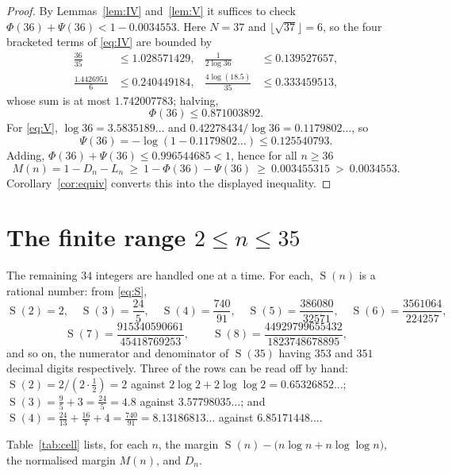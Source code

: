 \documentclass[11pt]{amsart}
\DeclareMathOperator{\Sfun}{S}
\begin{document}
\begin{proof}
By Lemmas~\ref{lem:IV} and~\ref{lem:V} it suffices to check
$\Phi(36)+\Psi(36)<1-0.0034553$. Here $N=37$ and $\lfloor\sqrt{37}\rfloor=6$, so the four
bracketed terms of \eqref{eq:IV} are bounded by
\begin{align*}
 \tfrac{36}{35}&\le1.028571429, &
 \tfrac1{2\log36}&\le0.139527657,\\
 \tfrac{1.4426951}{6}&\le0.240449184, &
 \tfrac{4\log(18.5)}{35}&\le0.333459513,
\end{align*}
whose sum is at most $1.742007783$; halving,
\[
 \Phi(36)\le0.871003892 .
\]
For \eqref{eq:V}, $\log36=3.5835189\ldots$ and
$0.42278434/\log36=0.1179802\ldots$, so
\[
 \Psi(36)=-\log(1-0.1179802\ldots)\le0.125540793 .
\]
Adding, $\Phi(36)+\Psi(36)\le0.996544685<1$, hence for all $n\ge36$
\[
 M(n)=1-D_n-L_n\ \ge\ 1-\Phi(36)-\Psi(36)\ \ge\ 0.003455315\ >\ 0.0034553 .
\]
Corollary~\ref{cor:equiv} converts this into the displayed inequality.
\end{proof}

\section{The finite range $2\le n\le35$}

The remaining $34$ integers are handled one at a time. For each, $\Sfun(n)$ is a rational
number: from \eqref{eq:S},
\[
 \Sfun(2)=2,\quad
 \Sfun(3)=\frac{24}{5},\quad
 \Sfun(4)=\frac{740}{91},\quad
 \Sfun(5)=\frac{386080}{32571},\quad
 \Sfun(6)=\frac{3561064}{224257},
\]
\[
 \Sfun(7)=\frac{915340590661}{45418769253},\qquad
 \Sfun(8)=\frac{44929799655432}{1823748678895},
\]
and so on, the numerator and denominator of $\Sfun(35)$ having $353$ and $351$ decimal
digits respectively. Three of the rows can be read off by hand:
$\Sfun(2)=2/(2\cdot\frac12)=2$ against $2\log2+2\log\log2=0.65326852\ldots$;
$\Sfun(3)=\frac95+3=\frac{24}5=4.8$ against $3.57798035\ldots$; and
$\Sfun(4)=\frac{24}{13}+\frac{16}{7}+4=\frac{740}{91}=8.13186813\ldots$ against
$6.85171448\ldots$.

Table~\ref{tab:cell} lists, for each $n$, the margin
$\Sfun(n)-\bigl(n\log n+n\log\log n\bigr)$, the normalised margin $M(n)$, and $D_n$.
\end{document}
